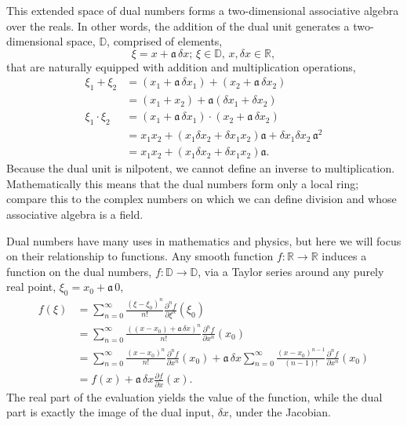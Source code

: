 This extended space of dual numbers forms a two-dimensional associative algebra 
over the reals.  In other words, the addition of the dual unit generates a two-dimensional
space, $\mathbb{D}$, comprised of elements,
%
\begin{equation*}
\xi = x + \mathfrak{a} \, \delta x; \, \xi \in \mathbb{D}, \, x, \delta x \in \mathbb{R},
\end{equation*}
%
that are naturally equipped with addition and multiplication operations,
%
\begin{align*}
\xi_{1} + \xi_{2} 
&=
 \left( x_{1} + \mathfrak{a} \, \delta x_{1} \right) 
 + \left( x_{2} + \mathfrak{a} \,  \delta x_{2} \right) 
\\
&=
\left( x_{1} + x_{2} \right) 
+ \mathfrak{a} \left( \delta x_{1} + \delta x_{2} \right) 
\\
\xi_{1} \cdot \xi_{2} 
&= 
\left( x_{1} + \mathfrak{a} \, \delta x_{1} \right) 
\cdot \left( x_{2} + \mathfrak{a} \, \delta x_{2} \right) 
\\
&= 
x_{1} x_{2} + \left( x_{1} \delta x_{2} 
+ \delta x_{1} x_{2} \right) \mathfrak{a} 
+ \delta x_{1} \delta x_{2} \, \mathfrak{a}^{2} 
\\
&= 
x_{1} x_{2} + \left( x_{1} \delta x_{2} + \delta x_{1} x_{2} \right) \mathfrak{a}.
\end{align*}  
%
Because the dual unit is nilpotent, we cannot define an inverse to multiplication.  
Mathematically this means that the dual numbers form only a local ring; compare this to 
the complex numbers on which we can define division and whose associative algebra is a field.

Dual numbers have many uses in mathematics and physics, but here we will focus on their
relationship to functions.  Any smooth function $f : \mathbb{R} \rightarrow \mathbb{R}$ 
induces a function on the dual numbers, $f : \mathbb{D} \rightarrow \mathbb{D}$, 
via a Taylor series around any purely real point, $\xi_{0} = x_{0} + \mathfrak{a} \, 0$,
%
\begin{align*}
f \! \left( \xi \right) 
&= 
\sum_{n = 0}^{\infty} \frac{ \left( \xi - \xi_{0} \right)^{n} }{n!} 
\frac{ \partial^{n} f }{ \partial \xi^{n} } \! \left( \xi_{0} \right) 
\\
&= 
\sum_{n = 0}^{\infty} \frac{ \left( \left( x - x_{0} \right) + \mathfrak{a} \, \delta x \right)^{n} }{n!} 
\frac{ \partial^{n} f }{ \partial x^{n} } \! \left( x_{0} \right)
\\
&= 
\sum_{n = 0}^{\infty} \frac{ \left( x - x_{0} \right)^{n} }{n!} 
\frac{ \partial^{n} f }{ \partial x^{n} } \! \left( x_{0} \right)
+ \mathfrak{a} \, \delta x \sum_{n = 0}^{\infty} \frac{ \left( x - x_{0} \right)^{n - 1} }{\left( n - 1 \right)!} 
\frac{ \partial^{n} f }{ \partial x^{n} } \! \left( x_{0} \right) 
\\
&= 
f \! \left( x \right) 
+ \mathfrak{a} \, \delta x \frac{ \partial f }{ \partial x } \! \left( x \right).
\end{align*}
%
The real part of the evaluation yields the value of the function, while the dual part
is exactly the image of the dual input, $\delta x$, under the Jacobian.

